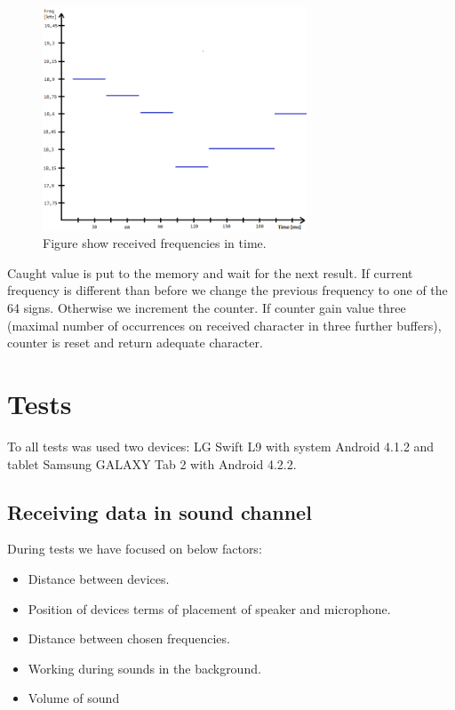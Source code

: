 \documentclass[11pt,titlepage]{article}
\theoremstyle{plain}
\begin{document}
\begin{figure}[H]
	\centering
	\includegraphics[width=0.70\textwidth]{img/receiving}
	\caption{Figure show received frequencies in time.}
\end{figure}

Caught value is put to the memory and wait for the next result. If current frequency is different than before we change the previous frequency to one of the 64 signs. Otherwise we increment the counter. If counter gain value three (maximal number of occurrences on received character in three further buffers), counter is reset and return adequate character.


\section{Tests}
To all tests was used two devices: LG Swift L9 with system Android 4.1.2 and tablet Samsung GALAXY Tab 2 with Android 4.2.2. 

\subsection{Receiving data in sound channel}
During tests we have focused on below factors:
\begin{itemize}
\item Distance between devices.
\item Position of devices terms of placement of speaker and microphone.
\item Distance between chosen frequencies.
\item Working during sounds in the background.
\item Volume of sound
\end{itemize}
\end{document}
